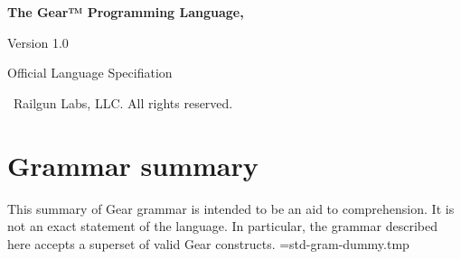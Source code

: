 \documentclass[paper=a4,chapterprefix=true,10pt,oneside]{scrbook}
\author{Henry G. Stratmann III}
\date{} %
\makeatletter
\def\gramSec[#1]#2{}
\newcommand{\FlushAndPrintGrammar}{%
\immediate\closeout\XTR@out%
\immediate\openout\XTR@out=std-gram-dummy.tmp%
\def\gramSec[##1]##2{\section[##1]{##2}}%
%
}
\makeatother
\begin{document}
\begin{titlepage}
  \raggedleft
  \vspace*{4in}

  {\Huge\bfseries The Gear™ Programming Language, \par Version 1.0 \par}
  \vspace{0.3in}

  {\huge Official Language Specifiation \par}
  \vspace{0.3in}

  \vfill
  {\textcopyright~Railgun Labs, LLC. All rights reserved. \par}
\end{titlepage}

\frontmatter

\tableofcontents

\mainmatter


\appendix


\chapter{Grammar summary}%
%
%
This summary of Gear grammar is intended to be an aid to comprehension.
It is not an exact statement of the language.
In particular, the grammar described here accepts a superset of valid Gear constructs.
\FlushAndPrintGrammar

\backmatter
\printindex

\end{document}
